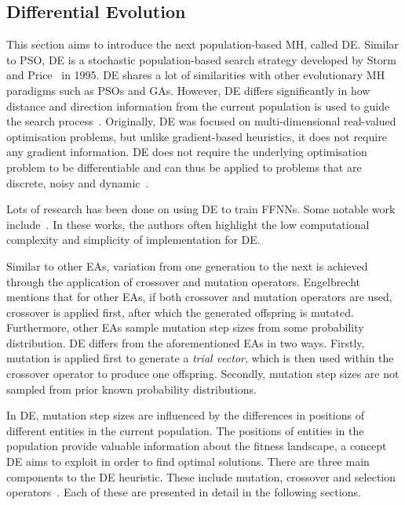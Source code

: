 \subsection{Differential Evolution}\label{sec:heuristics:mh:de}

This section aims to introduce the next population-based \acs{MH}, called \acf{DE}. Similar to \acs{PSO}, \acs{DE} is a stochastic population-based search strategy developed by Storm and Price~\cite{ref:price:2006} in 1995. \Ac{DE} shares a lot of similarities with other evolutionary \acs{MH} paradigms such as \acp{PSO} and \acp{GA}. However, \acs{DE} differs significantly in how distance and direction information from the current population is used to guide the search process~\cite{ref:engelbrecht:2007}. Originally, \acs{DE} was focused on multi-dimensional real-valued optimisation problems, but unlike gradient-based heuristics, it does not require any gradient information. \acs{DE} does not require the underlying optimisation problem to be differentiable and can thus be applied to problems that are discrete, noisy and dynamic~\cite{ref:rocca:2011}.

Lots of research has been done on using \acs{DE} to train \acp{FFNN}. Some notable work include~\cite{ref:ilonen:2003, ref:slowik:2008, ref:mingguang:2009}. In these works, the authors often highlight the low computational complexity and simplicity of implementation for \acs{DE}.

Similar to other \acp{EA}, variation from one generation to the next is achieved through the application of crossover and mutation operators. Engelbrecht~\cite{ref:engelbrecht:2007} mentions that for other \acp{EA}, if both crossover and mutation operators are used, crossover is applied first, after which the generated offspring is mutated. Furthermore, other \acp{EA} sample mutation step sizes from some probability distribution. \acs{DE} differs from the aforementioned \acp{EA} in two ways. Firstly, mutation is applied first to generate a \textit{trial vector}, which is then used within the crossover operator to produce one offspring. Secondly, mutation step sizes are not sampled from prior known probability distributions.

In \acs{DE}, mutation step sizes are influenced by the differences in positions of different entities in the current population. The positions of entities in the population provide valuable information about the fitness landscape, a concept \acs{DE} aims to exploit in order to find optimal solutions. There are three main components to the \acs{DE} heuristic. These include mutation, crossover and selection operators~\cite{ref:price:2006}. Each of these are presented in detail in the following sections.

